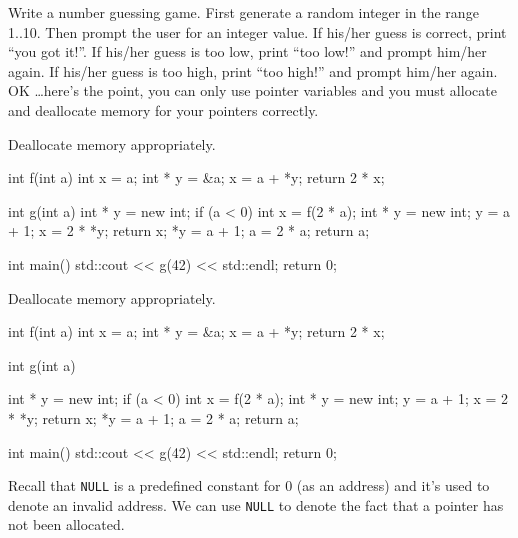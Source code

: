 \begin{ex}
Write a number guessing game. First generate a random integer in the range 1..10. Then prompt the user for an integer value. If his/her guess is correct, print ``you got it!''. If his/her guess is too low, print ``too low!'' and prompt him/her again. If his/her guess is too high, print ``too high!'' and prompt him/her again. OK \ldots here's the point, you can only use pointer variables and you must allocate and deallocate memory for your pointers correctly.
\end{ex}

\begin{ex}
Deallocate memory appropriately.

\begin{consolethree}[escapeinside=||]
int f(int a)
{
    int x = a;
    int * y = &a;
    x = a + *y;
    return 2 * x;
}

int g(int a)
{
    int * y = new int;
    if (a < 0)
    {
        int x = f(2 * a);
        int * y = new int;
        y = a + 1;
        x = 2 * *y;
        return x;
    }
    *y = a + 1;
    a = 2 * a;
    return a;
}

int main()
{
    std::cout << g(42) << std::endl;
    return 0;
}
\end{consolethree}

\end{ex}

\begin{ex}
Deallocate memory appropriately.

\begin{consolethree}[escapeinside=||]
int f(int a)
{
    int x = a;
    int * y = &a;
    x = a + *y;
    return 2 * x;
}

int g(int a)
{

   int * y = new int;
   if (a < 0)
   {
        int x = f(2 * a);
        int * y = new int;
        y = a + 1;
        x = 2 * *y;
        return x;
    }
    *y = a + 1;
    a = 2 * a;
    return a;
}

int main()
{
    std::cout << g(42) << std::endl;
    return 0;
}
\end{consolethree}
\end{ex}

\newpage{}

Recall that \texttt{NULL} is a predefined constant for 0 (as an address)
and it's used to denote an invalid address. We can use \texttt{NULL} to
denote the fact that a pointer has not been allocated.

